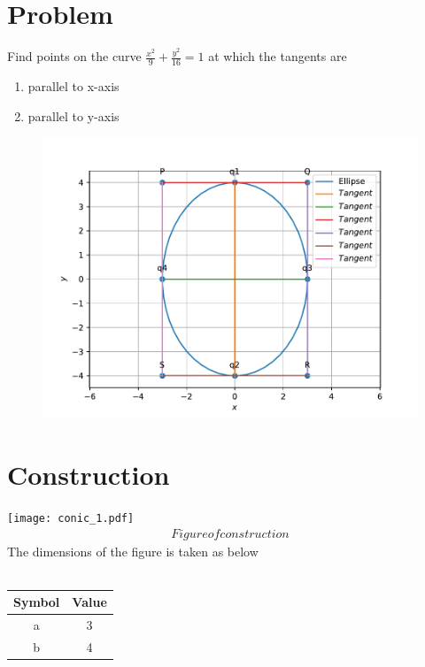 \documentclass[10pt, a4paper]{article}
\title{\mytitle}
\author{\myauthor\hspace{1em}\\\contact\\FWC22034\hspace{6.5em}IITH\hspace{0.5em}\mymodule\hspace{6em}Assignment}
\begin{document}
	\maketitle
	\tableofcontents
   \section{Problem}
   \fi
 Find points on the curve $\frac{x^2}{9}+\frac{y^2}{16}=1$ at which the tangents are 
 \begin{enumerate}
	 \item parallel to x-axis\\  
	 \item parallel to y-axis
 \end{enumerate}
 \solution 
	\begin{figure}[!h]
		\centering
 \includegraphics[width=\columnwidth]{chapters/12/6/3/13/figs/conic_1.pdf}
		\caption{}
		\label{fig:12/6/3/13}
  	\end{figure}
 \iffalse
\section{Construction}
  \texttt{[image: conic\_1.pdf]}
  \begin{align}
  Figure of construction
  	\end{align}
  The dimensions of the figure is taken as below\\\\
{
\setlength\extrarowheight{2pt}
\aligning
\begin{tabular}{|c|c|}
 \hline
 \textbf{Symbol}&\textbf{Value}\\
 \hline
 a&3\\
 \hline
 b&4\\
 \hline
\end{tabular}
}	
\end{document}

